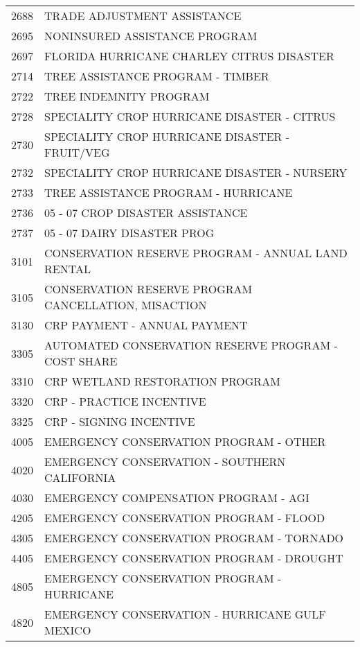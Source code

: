 \begin{longtable}{ll}
\cline{1-2}
2688 & TRADE ADJUSTMENT ASSISTANCE \\
\cline{1-2}
2695 & NONINSURED ASSISTANCE PROGRAM \\
\cline{1-2}
2697 & FLORIDA HURRICANE CHARLEY CITRUS DISASTER \\
\cline{1-2}
2714 & TREE ASSISTANCE PROGRAM - TIMBER \\
\cline{1-2}
2722 & TREE INDEMNITY PROGRAM \\
\cline{1-2}
2728 & SPECIALITY CROP HURRICANE DISASTER - CITRUS \\
\cline{1-2}
2730 & SPECIALITY CROP HURRICANE DISASTER - FRUIT/VEG \\
\cline{1-2}
2732 & SPECIALITY CROP HURRICANE DISASTER - NURSERY \\
\cline{1-2}
2733 & TREE ASSISTANCE PROGRAM - HURRICANE \\
\cline{1-2}
2736 & 05 - 07 CROP DISASTER ASSISTANCE \\
\cline{1-2}
2737 & 05 - 07 DAIRY DISASTER PROG \\
\cline{1-2}
3101 & CONSERVATION RESERVE PROGRAM - ANNUAL LAND RENTAL \\
\cline{1-2}
3105 & CONSERVATION RESERVE PROGRAM CANCELLATION, MISACTION \\
\cline{1-2}
3130 & CRP PAYMENT - ANNUAL PAYMENT \\
\cline{1-2}
3305 & AUTOMATED CONSERVATION RESERVE PROGRAM - COST SHARE \\
\cline{1-2}
3310 & CRP WETLAND RESTORATION PROGRAM \\
\cline{1-2}
3320 & CRP - PRACTICE INCENTIVE \\
\cline{1-2}
3325 & CRP - SIGNING INCENTIVE \\
\cline{1-2}
4005 & EMERGENCY CONSERVATION PROGRAM - OTHER \\
\cline{1-2}
4020 & EMERGENCY CONSERVATION - SOUTHERN CALIFORNIA \\
\cline{1-2}
4030 & EMERGENCY COMPENSATION PROGRAM - AGI \\
\cline{1-2}
4205 & EMERGENCY CONSERVATION PROGRAM - FLOOD \\
\cline{1-2}
4305 & EMERGENCY CONSERVATION PROGRAM - TORNADO \\
\cline{1-2}
4405 & EMERGENCY CONSERVATION PROGRAM - DROUGHT \\
\cline{1-2}
4805 & EMERGENCY CONSERVATION PROGRAM - HURRICANE \\
\cline{1-2}
4820 & EMERGENCY CONSERVATION - HURRICANE GULF MEXICO \\
\cline{1-2}

\end{longtable}
